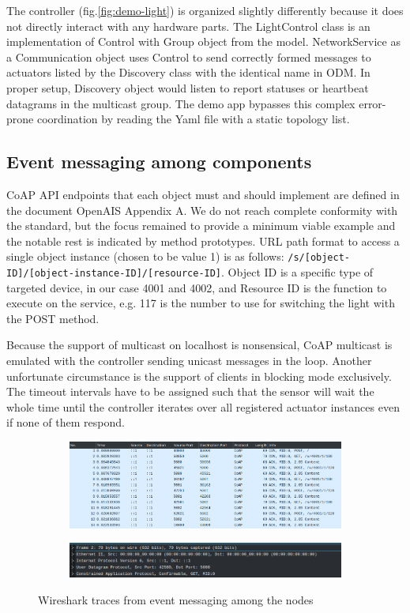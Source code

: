 \documentclass[11pt, english, a4paper, twoside]{article}
\begin{document}
The controller (fig.\ref{fig:demo-light}) is organized slightly differently because it does not directly interact with any hardware parts. The LightControl class is an implementation of Control with Group object from the model. NetworkService as a Communication object uses Control to send correctly formed messages to actuators listed by the Discovery class with the identical name in ODM. In proper setup, Discovery object would listen to report statuses or heartbeat datagrams in the multicast group. The demo app bypasses this complex error-prone coordination by reading the Yaml file with a static topology list. 

\subsection{Event messaging among components}
CoAP API endpoints that each object must and should implement are defined in the document OpenAIS Appendix A. We do not reach complete conformity with the standard, but the focus remained to provide a minimum viable example and the notable rest is indicated by method prototypes. URL path format to access a single object instance (chosen to be value 1) is as follows: \verb|/s/[object-ID]/[object-instance-ID]/[resource-ID]|. Object ID is a specific type of targeted device, in our case 4001 and 4002, and Resource ID is the function to execute on the service, e.g. 117 is the number to use for switching the light with the POST method.

Because the support of multicast on localhost is nonsensical, CoAP multicast is emulated with the controller sending unicast messages in the loop. Another unfortunate circumstance is the support of clients in blocking mode exclusively. The timeout intervals have to be assigned such that the sensor will wait the whole time until the controller iterates over all registered actuator instances even if none of them respond. 

\begin{figure}
	\centering
	\begin{subfigure}[b]{0.9\textwidth}
		\includegraphics[width=\textwidth]{Dim-light.png}
	\end{subfigure}
    \hfill
    \begin{subfigure}[b]{0.9\textwidth}
		\includegraphics[width=\textwidth]{network-stack-wireshark.png}
	\end{subfigure}
	\caption{Wireshark traces from event messaging among the nodes}
	\label{fig:wireshark}
\end{figure}
\end{document}
